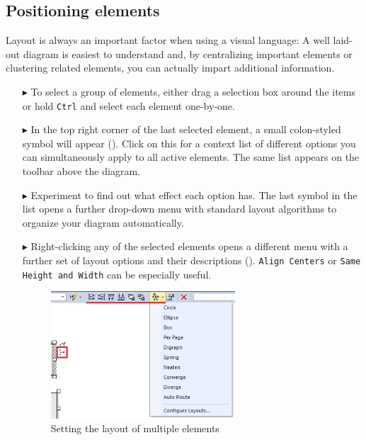 \subsection{Positioning elements}

Layout is always an important factor when using a visual language:
A well laid-out diagram is easiest to understand and, by centralizing important
elements or clustering related elements, you can actually impart additional information.

\begin{enumerate}
\item[$\blacktriangleright$] To select a group of elements, either drag a selection box around the items or hold \texttt{Ctrl} and select each element
one-by-one.

\item[$\blacktriangleright$] In the top right corner of the last selected element, a small colon-styled symbol will appear (). Click on
this for a context list of different options you can simultaneously apply to all active elements. The same list appears on the toolbar above the
diagram. 

\item[$\blacktriangleright$] Experiment to find out what effect each option has. The last symbol in the list opens a further drop-down menu with standard layout
algorithms to organize your diagram automatically.

\item[$\blacktriangleright$] Right-clicking any of the selected elements opens a different menu with a further set of layout options and their descriptions
(). \texttt{Align Centers} or \texttt{Same Height and Width} can be especially useful.

\begin{figure}[htbp]
\begin{center} 
  \includegraphics[width=0.65\textwidth]{ea_layoutElementsCommonContext}
  \caption{Setting the layout of multiple elements}  
  \label{ea:layout1}
\end{center}
\end{figure}


\end{enumerate}
